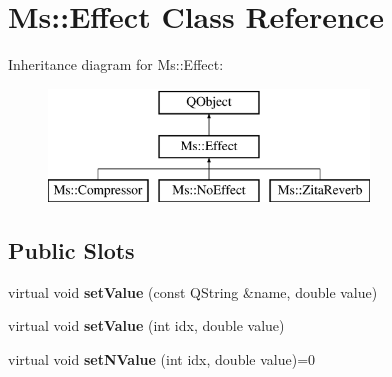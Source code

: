 \hypertarget{class_ms_1_1_effect}{}\section{Ms\+:\+:Effect Class Reference}
\label{class_ms_1_1_effect}
Inheritance diagram for Ms\+:\+:Effect\+:\begin{figure}[H]
\begin{center}
\leavevmode
\includegraphics[height=3.000000cm]{class_ms_1_1_effect}
\end{center}
\end{figure}
\subsection*{Public Slots}
\begin{DoxyCompactItemize}
\item 
\mbox{\label{class_ms_1_1_effect_a19afa1e257ad842f0a9bce260dde003f}} 
virtual void {\bfseries set\+Value} (const Q\+String \&name, double value)
\item 
\mbox{\label{class_ms_1_1_effect_ab0e8f7e8bf6334e9cb3c68d49104fd47}} 
virtual void {\bfseries set\+Value} (int idx, double value)
\item 
\mbox{\label{class_ms_1_1_effect_aa2aaeb8c4e6b5b748eaa9776c9cb3495}} 
virtual void {\bfseries set\+N\+Value} (int idx, double value)=0
\end{DoxyCompactItemize}

